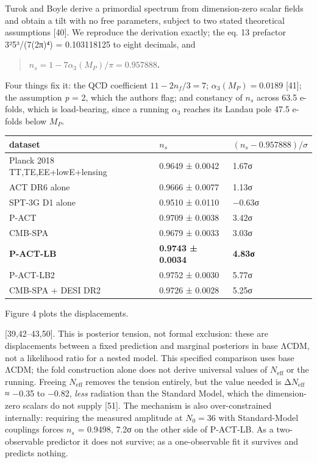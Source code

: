 \documentclass[
]{article}
\newcounter{none} %
\begin{document}
Turok and Boyle derive a primordial spectrum from dimension-zero scalar
fields and obtain a tilt with no free parameters, subject to two stated
theoretical assumptions {[}40{]}. We reproduce the derivation exactly;
the eq. 13 prefactor 3²5³/(7(2π)⁴) = 0.103118125 to eight decimals, and

\begin{quote}
\textbf{\(n_s=1-7\alpha_3(M_P)/\pi=0.957888\).}
\end{quote}

Four things fix it: the QCD coefficient \(11-2n_f/3=7\);
\(\alpha_3(M_P)=0.0189\) {[}41{]}; the assumption \emph{p} = 2, which
the authors flag; and constancy of \(n_s\) across 63.5 e-folds, which is
load-bearing, since a running \(\alpha_3\) reaches its Landau pole 47.5
e-folds below \(M_{P}\).

{\def\LTcaptype{none} %
\begin{longtable}[]{@{}lll@{}}
\toprule\noalign{}
dataset & \(n_s\) & \((n_s-0.957888)/\sigma\) \\
\midrule\noalign{}
\endhead
\bottomrule\noalign{}
\endlastfoot
Planck 2018 TT,TE,EE+lowE+lensing & 0.9649 ± 0.0042 & 1.67σ \\
ACT DR6 alone & 0.9666 ± 0.0077 & 1.13σ \\
SPT-3G D1 alone & 0.9510 ± 0.0110 & −0.63σ \\
P-ACT & 0.9709 ± 0.0038 & 3.42σ \\
CMB-SPA & 0.9679 ± 0.0033 & 3.03σ \\
\textbf{P-ACT-LB} & \textbf{0.9743 ± 0.0034} & \textbf{4.83σ} \\
P-ACT-LB2 & 0.9752 ± 0.0030 & 5.77σ \\
CMB-SPA + DESI DR2 & 0.9726 ± 0.0028 & 5.25σ \\
\end{longtable}
}

Figure 4 plots the displacements.

{[}39,42--43,50{]}. This is posterior tension, not formal exclusion:
these are displacements between a fixed prediction and marginal
posteriors in base ΛCDM, not a likelihood ratio for a nested model. This
specified comparison uses base ΛCDM; the fold construction alone does
not derive universal values of \(N_{\mathrm{eff}}\) or the running.
Freeing \(N_{\mathrm{eff}}\) removes the tension entirely, but the value
needed is Δ\(N_{\mathrm{eff}}\) ≈ −0.35 to −0.82, \emph{less} radiation
than the Standard Model, which the dimension-zero scalars do not supply
{[}51{]}. The mechanism is also over-constrained internally: requiring
the measured amplitude at \(N_0=36\) with Standard-Model couplings
forces \(n_s\) = 0.9498, 7.2σ on the other side of P-ACT-LB. As a
two-observable predictor it does not survive; as a one-observable fit it
survives and predicts nothing.
\end{document}
